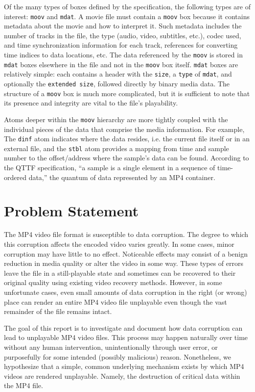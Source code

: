 Of the many types of boxes defined by the specification, the following types are of interest: \texttt{moov} and \texttt{mdat}. A movie file must contain a \texttt{moov} box because it contains metadata about the movie and how to interpret it. Such metadata includes the number of tracks in the file, the type (audio, video, subtitles, etc.), codec used, and time synchronization information for each track, references for converting time indices to data locations, etc. The data referenced by the \texttt{moov} is stored in \texttt{mdat} boxes elsewhere in the file and not in the \texttt{moov} box itself. \texttt{mdat} boxes are relatively simple: each contains a header with the \texttt{size}, a \texttt{type} of \texttt{mdat}, and optionally the \texttt{extended size}, followed directly by binary media data. The structure of a \texttt{moov} box is much more complicated, but it is sufficient to note that its presence and integrity are vital to the file's playability.

Atoms deeper within the \texttt{moov} hierarchy are more tightly coupled with the individual pieces of the data that comprise the media information. For example, The \texttt{dinf} atom indicates where the data resides, i.e. the current file itself or in an external file, and the \texttt{stbl} atom provides a mapping from time and sample number to the offset/address where the sample's data can be found. According to the QTTF specification, ``a sample is a single element in a sequence of time-ordered data,'' the quantum of data represented by an MP4 container.

\section{Problem Statement}

The MP4 video file format is susceptible to data corruption. The degree to which this corruption affects the encoded video varies greatly. In some cases, minor corruption may have little to no effect. Noticeable effects may consist of a benign reduction in media quality or alter the video in some way. These types of errors leave the file in a still-playable state and sometimes can be recovered to their original quality using existing video recovery methods. However, in some unfortunate cases, even small amounts of data corruption in the right (or wrong) place can render an entire MP4 video file unplayable even though the vast remainder of the file remains intact.

The goal of this report is to investigate and document how data corruption can lead to unplayable MP4 video files. This process may happen naturally over time without any human intervention, unintentionally through user error, or purposefully for some intended (possibly malicious) reason. Nonetheless, we hypothesize that a simple, common underlying mechanism exists by which MP4 videos are rendered unplayable. Namely, the destruction of critical data within the MP4 file.